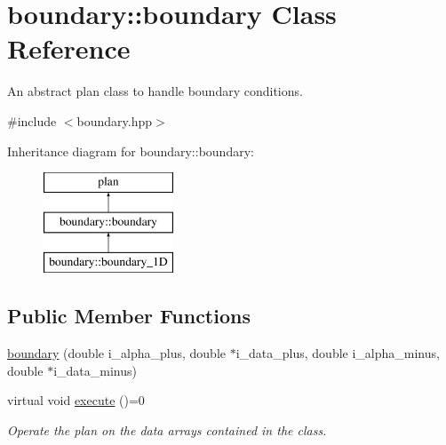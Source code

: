 \hypertarget{classboundary_1_1boundary}{\section{boundary\-:\-:boundary Class Reference}
\label{classboundary_1_1boundary}
}


An abstract plan class to handle boundary conditions.  




{\ttfamily \#include $<$boundary.\-hpp$>$}

Inheritance diagram for boundary\-:\-:boundary\-:\begin{figure}[H]
\begin{center}
\leavevmode
\includegraphics[height=3.000000cm]{classboundary_1_1boundary}
\end{center}
\end{figure}
\subsection*{Public Member Functions}
\begin{DoxyCompactItemize}
\item 
\hyperlink{classboundary_1_1boundary_af1b5c319decaac90b9a6762d8c5d7438}{boundary} (double i\-\_\-alpha\-\_\-plus, double $\ast$i\-\_\-data\-\_\-plus, double i\-\_\-alpha\-\_\-minus, double $\ast$i\-\_\-data\-\_\-minus)
\item 
virtual void \hyperlink{classboundary_1_1boundary_ad5c7967ab2e710a86d1d89d4600c7568}{execute} ()=0
\begin{DoxyCompactList}\small\item\em Operate the plan on the data arrays contained in the class. \end{DoxyCompactList}\end{DoxyCompactItemize}
